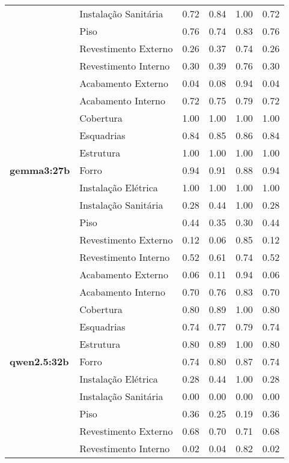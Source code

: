\begin{table}[htbp]
\begin{tabular}{llcccc}
     & \multirow{1}{*}{Instalação Sanitária} & 0.72 & 0.84 & 1.00 & 0.72 \\
     & \multirow{1}{*}{Piso} & 0.76 & 0.74 & 0.83 & 0.76 \\
     & \multirow{1}{*}{Revestimento Externo} & 0.26 & 0.37 & 0.74 & 0.26 \\
     & \multirow{1}{*}{Revestimento Interno} & 0.30 & 0.39 & 0.76 & 0.30 \\
    \midrule
    \multirow{11}{*}{\textbf{gemma3:27b}} & \multirow{1}{*}{Acabamento Externo} & 0.04 & 0.08 & 0.94 & 0.04 \\
     & \multirow{1}{*}{Acabamento Interno} & 0.72 & 0.75 & 0.79 & 0.72 \\
     & \multirow{1}{*}{Cobertura} & 1.00 & 1.00 & 1.00 & 1.00 \\
     & \multirow{1}{*}{Esquadrias} & 0.84 & 0.85 & 0.86 & 0.84 \\
     & \multirow{1}{*}{Estrutura} & 1.00 & 1.00 & 1.00 & 1.00 \\
     & \multirow{1}{*}{Forro} & 0.94 & 0.91 & 0.88 & 0.94 \\
     & \multirow{1}{*}{Instalação Elétrica} & 1.00 & 1.00 & 1.00 & 1.00 \\
     & \multirow{1}{*}{Instalação Sanitária} & 0.28 & 0.44 & 1.00 & 0.28 \\
     & \multirow{1}{*}{Piso} & 0.44 & 0.35 & 0.30 & 0.44 \\
     & \multirow{1}{*}{Revestimento Externo} & 0.12 & 0.06 & 0.85 & 0.12 \\
     & \multirow{1}{*}{Revestimento Interno} & 0.52 & 0.61 & 0.74 & 0.52 \\
    \midrule
    \multirow{11}{*}{\textbf{qwen2.5:32b}} & \multirow{1}{*}{Acabamento Externo} & 0.06 & 0.11 & 0.94 & 0.06 \\
     & \multirow{1}{*}{Acabamento Interno} & 0.70 & 0.76 & 0.83 & 0.70 \\
     & \multirow{1}{*}{Cobertura} & 0.80 & 0.89 & 1.00 & 0.80 \\
     & \multirow{1}{*}{Esquadrias} & 0.74 & 0.77 & 0.79 & 0.74 \\
     & \multirow{1}{*}{Estrutura} & 0.80 & 0.89 & 1.00 & 0.80 \\
     & \multirow{1}{*}{Forro} & 0.74 & 0.80 & 0.87 & 0.74 \\
     & \multirow{1}{*}{Instalação Elétrica} & 0.28 & 0.44 & 1.00 & 0.28 \\
     & \multirow{1}{*}{Instalação Sanitária} & 0.00 & 0.00 & 0.00 & 0.00 \\
     & \multirow{1}{*}{Piso} & 0.36 & 0.25 & 0.19 & 0.36 \\
     & \multirow{1}{*}{Revestimento Externo} & 0.68 & 0.70 & 0.71 & 0.68 \\
     & \multirow{1}{*}{Revestimento Interno} & 0.02 & 0.04 & 0.82 & 0.02 \\
    \bottomrule
  \end{tabular}
\end{table}